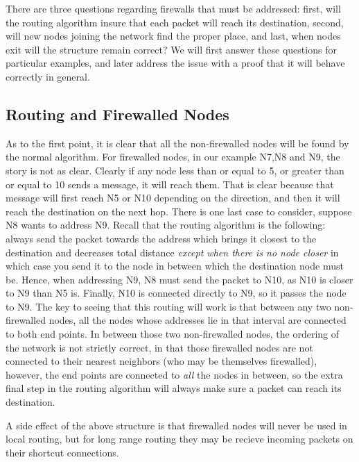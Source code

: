 \documentclass[11pt]{article}
\begin{document}
There are three questions regarding firewalls that must be addressed: first,
will the routing algorithm insure that each packet will reach its destination,
second, will new nodes joining the network find the proper place, and last,
when nodes exit will the structure remain correct?  We will first answer these
questions for particular examples, and later address the issue with a proof
that it will behave correctly in general.

\subsection{Routing and Firewalled Nodes}
As to the first point, it is clear that all the non-firewalled nodes will be
found by the normal algorithm.  For firewalled nodes, in our example N7,N8 and
N9, the story is not as clear.  Clearly if any node less than or equal to 5,
or greater than or equal to 10 sends a message, it will reach them.  That is
clear because that message will first reach N5 or N10 depending on the
direction, and then it will reach the destination on the next hop.  There is
one last case to consider, suppose N8 wants to address N9.  Recall that the
routing algorithm is the following: always send the packet towards the address
which brings it closest to the destination and decreases total distance
\emph{except when there is no node
closer} in which case you send it to the node in between which the destination
node must be.  Hence, when addressing N9, N8 must send the packet to N10, as
N10 is closer to N9 than N5 is.  Finally, N10 is connected directly to N9, so
it passes the node to N9.  The key to seeing that this routing will work is
that between any two non-firewalled nodes, all the nodes whose addresses lie
in that interval are connected to both end points.  In between those two
non-firewalled nodes, the ordering of the network is not strictly correct, in
that those firewalled nodes are not connected to their nearest neighbors (who
may be themselves firewalled), however, the end points are connected to
\emph{all} the nodes in between, so the extra final step in the routing
algorithm will always make sure a packet can reach its destination.

A side effect of the above structure is that firewalled nodes will never be
used in local routing, but for long range routing they may be recieve
incoming packets on their shortcut connections.
\end{document}
